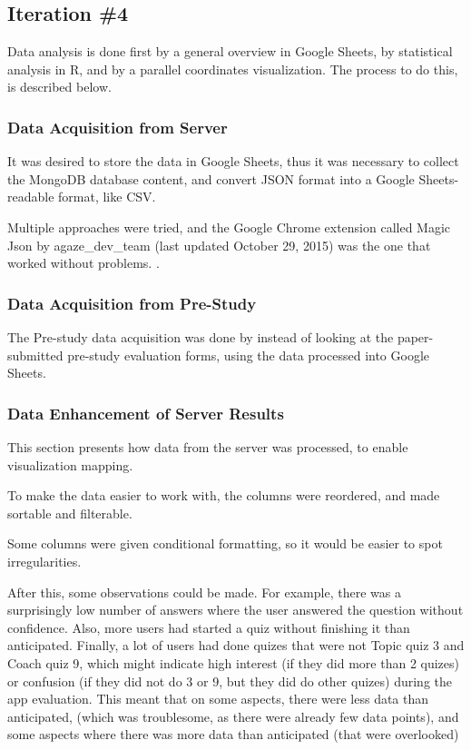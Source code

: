 \subsection{Iteration \#4}

Data analysis is done first by a general overview in Google Sheets, by statistical analysis in R, and by a parallel coordinates visualization. The process to do this, is described below.

\subsubsection{Data Acquisition from Server}

It was desired to store the data in Google Sheets, thus it was necessary to collect the MongoDB database content, and convert JSON format into a Google Sheets-readable format, like CSV.

Multiple approaches were tried, and the Google Chrome extension called Magic Json by agaze\_dev\_team (last updated October 29, 2015) %
was the one that worked without problems. \citep{agaze}.

\subsubsection{Data Acquisition from Pre-Study}

The Pre-study data acquisition was done by instead of looking at the paper-submitted pre-study evaluation forms, using the data processed into Google Sheets.

\subsubsection{Data Enhancement of Server Results}

This section presents how data from the server was processed, to enable visualization mapping.

To make the data easier to work with, the columns were reordered, and made sortable and filterable.

Some columns were given conditional formatting, so it would be easier to spot irregularities.


After this, some observations could be made. For example, there was a surprisingly low number of answers where the user answered the question without confidence. Also, more users had started a quiz without finishing it than anticipated. Finally, a lot of users had done quizes that were not Topic quiz 3 and Coach quiz 9, which might indicate high interest (if they did more than 2 quizes) or confusion (if they did not do 3 or 9, but they did do other quizes) during the app evaluation. This meant that on some aspects, there were less data than anticipated, (which was troublesome, as there were already few data points), and some aspects where there was more data than anticipated (that were overlooked)

